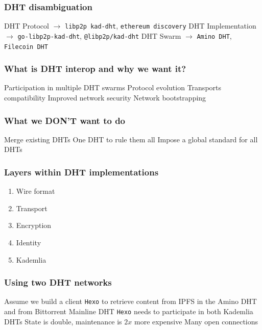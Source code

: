 \documentclass{../shipyard-slide}
\begin{document}
\begin{frame}
\frametitle{DHT disambiguation}

\begin{itemize}
	\itemc DHT Protocol $\xrightarrow{}$ \texttt{libp2p kad-dht}, \texttt{ethereum discovery}
	\itemc DHT Implementation $\xrightarrow{}$ \texttt{go-libp2p-kad-dht}, \texttt{@libp2p/kad-dht}
	\itemc DHT Swarm $\xrightarrow{}$ \texttt{Amino DHT}, \texttt{Filecoin DHT}
\end{itemize}
\end{frame}


\begin{frame}
\frametitle{What is DHT interop and why we want it?}

\begin{itemize}
	\itemc Participation in multiple DHT swarms
	\itemc Protocol evolution
	\itemc Transports compatibility
	\itemc Improved network security
	\itemc Network bootstrapping
\end{itemize}

\end{frame}

\begin{frame}
\frametitle{What we DON'T want to do}

\begin{itemize}
	\itemc Merge existing DHTs
	\itemc One DHT to rule them all
	\itemc Impose a global standard for all DHTs
\end{itemize}
\end{frame}

\begin{frame}
\frametitle{Layers within DHT implementations}

\begin{enumerate}
	\item Wire format
	\item Transport
	\item Encryption
	\item Identity
	\item Kademlia
\end{enumerate}
\end{frame}

\begin{frame}
\frametitle{Using two DHT networks}

\begin{itemize}
	\itemc Assume we build a client \texttt{Hexo} to retrieve content from IPFS in the Amino DHT and from Bittorrent Mainline DHT \smiley
	\itemc \texttt{Hexo} needs to participate in both Kademlia DHTs
	\itemc State is double, maintenance is $2x$ more expensive \frownie
	\itemc Many open connections \frownie
\end{itemize}

\vspace{1cm}

{\Large \;}

\end{frame}
\end{document}
